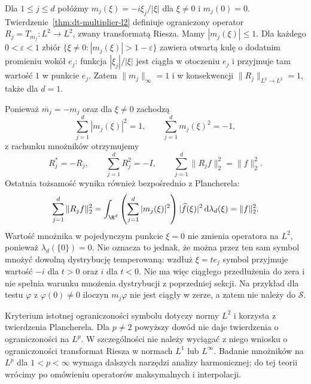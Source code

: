 \begin{przyklad}
Dla $1\le j\le d$ połóżmy
$m_j(\xi)=-i\xi_j/|\xi|$ dla $\xi\ne0$ i $m_j(0)=0$.
Twierdzenie~\ref{thm:dt-multiplier-l2} definiuje
ograniczony operator $R_j=T_{m_j}:L^2\to L^2$,
zwany transformatą Riesza.
Mamy $|m_j(\xi)|\le1$. Dla każdego
$0<\varepsilon<1$ zbiór
$\{\xi\ne0:|m_j(\xi)|>1-\varepsilon\}$
zawiera otwartą kulę o dodatnim promieniu
wokół $e_j$: funkcja $|\xi_j|/|\xi|$ jest
ciągła w otoczeniu $e_j$ i przyjmuje tam
wartość $1$ w punkcie $e_j$.
Zatem $\|m_j\|_\infty=1$ i w konsekwencji
$\|R_j\|_{L^2\to L^2}=1$, także dla $d=1$.

Ponieważ $\overline{m_j}=-m_j$ oraz dla
$\xi\ne0$ zachodzą
\[
 \sum_{j=1}^d |m_j(\xi)|^2=1,\qquad
 \sum_{j=1}^d m_j(\xi)^2=-1,
\]
z rachunku mnożników otrzymujemy
\[
 R_j^*=-R_j,\qquad
 \sum_{j=1}^d R_j^2=-I,\qquad
 \sum_{j=1}^d\|R_j f\|_2^2=\|f\|_2^2.
\]
Ostatnia tożsamość wynika również bezpośrednio
z Plancherela:
\[
 \sum_{j=1}^d\|R_j f\|_2^2
 =\int_{\R^d}
 \left(\sum_{j=1}^d|m_j(\xi)|^2\right)
 |\widehat f(\xi)|^2\,\mathrm d\lambda_d(\xi)
 =\|f\|_2^2.
\]
Wartość mnożnika w pojedynczym punkcie $\xi=0$
nie zmienia operatora na $L^2$, ponieważ
$\lambda_d(\{0\})=0$. Nie oznacza to jednak,
że można przez ten sam symbol mnożyć dowolną
dystrybucję temperowaną: wzdłuż $\xi=te_j$
symbol przyjmuje wartość $-i$ dla $t>0$
oraz $i$ dla $t<0$. Nie ma więc ciągłego
przedłużenia do zera i nie spełnia warunku
mnożenia dystrybucji z poprzedniej sekcji.
Na przykład dla testu $\varphi$ z $\varphi(0)\ne0$
iloczyn $m_j\varphi$ nie jest ciągły w zerze,
a zatem nie należy do $\mathcal S$.
\end{przyklad}

\begin{uwaga}
Kryterium istotnej ograniczoności symbolu
dotyczy normy $L^2$ i korzysta z twierdzenia
Plancherela. Dla $p\ne2$ powyższy dowód
nie daje twierdzenia o ograniczoności
na $L^p$. W szczególności nie należy
wyciągać z niego wniosku o ograniczoności
transformat Riesza w normach $L^1$ lub
$L^\infty$. Badanie mnożników na $L^p$
dla $1<p<\infty$ wymaga dalszych narzędzi
analizy harmonicznej; do tej teorii wrócimy po omówieniu operatorów maksymalnych i interpolacji.
\end{uwaga}
